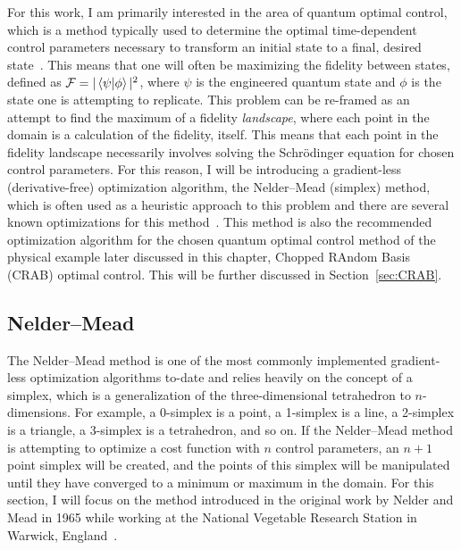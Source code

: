 For this work, I am primarily interested in the area of quantum optimal control, which is a method typically used to determine the optimal time-dependent control parameters necessary to transform an initial state to a final, desired state~\cite{werschnik2007}.
This means that one will often be maximizing the fidelity between states, defined as $\mathcal{F} = |\braket{\psi|\phi}|^2$, where $\psi$ is the engineered quantum state and $\phi$ is the state one is attempting to replicate.
This problem can be re-framed as an attempt to find the maximum of a fidelity \textit{landscape}, where each point in the domain is a calculation of the fidelity, itself.
This means that each point in the fidelity landscape necessarily involves solving the Schr\"odinger equation for chosen control parameters.
For this reason, I will be introducing a gradient-less (derivative-free) optimization algorithm, the Nelder--Mead (simplex) method, which is often used as a heuristic approach to this problem and there are several known optimizations for this method~\cite{nelder1965,kolda2003,lewis2007}.
This method is also the recommended optimization algorithm for the chosen quantum optimal control method of the physical example later discussed in this chapter, Chopped RAndom Basis (CRAB) optimal control.
This will be further discussed in Section~\ref{sec:CRAB}.

\subsection{Nelder--Mead}
\label{sec:NM}

The Nelder--Mead method is one of the most commonly implemented gradient-less optimization algorithms to-date and relies heavily on the concept of a simplex, which is a generalization of the three-dimensional tetrahedron to $n$-dimensions.
For example, a 0-simplex is a point, a 1-simplex is a line, a 2-simplex is a triangle, a 3-simplex is a tetrahedron, and so on.
If the Nelder--Mead method is attempting to optimize a cost function with $n$ control parameters, an $n+1$ point simplex will be created, and the points of this simplex will be manipulated until they have converged to a minimum or maximum in the domain.
For this section, I will focus on the method introduced in the original work by Nelder and Mead in 1965 while working at the National Vegetable Research Station in Warwick, England~\cite{nelder1965}.

